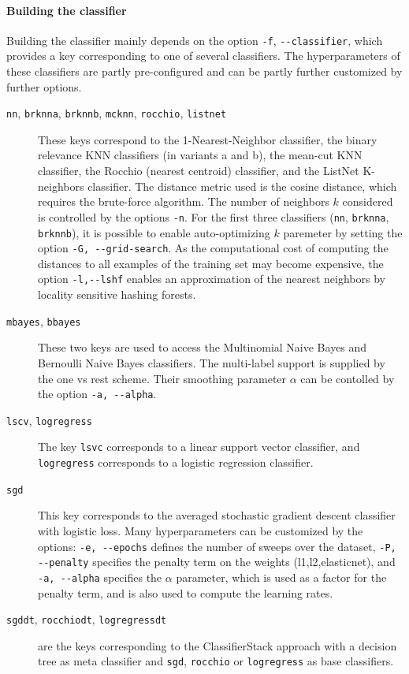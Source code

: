 \documentclass{article}
\begin{document}
\paragraph{Building the classifier}
Building the classifier mainly depends on the option \texttt{-f}, \texttt{{-}{-}classifier},
which provides a key corresponding to one of several classifiers.
The hyperparameters of these classifiers are partly pre-configured and can be partly further customized by further options.
\begin{description}
  \item[\texttt{nn}, \texttt{brknna}, \texttt{brknnb}, \texttt{mcknn}, \texttt{rocchio}, \texttt{listnet}]
    These keys correspond to the 1-Nearest-Neighbor classifier,
    the binary relevance KNN classifiers (in variants a and b),
    the mean-cut KNN classifier,
    the Rocchio (nearest centroid) classifier,
    and the ListNet K-neighbors classifier.
    The distance metric used is the cosine distance,
    which requires the brute-force algorithm.
    The number of neighbors $k$ considered is controlled by the options \texttt{-n}.
    For the first three classifiers (\texttt{nn}, \texttt{brknna}, \texttt{brknnb}),
    it is possible to enable auto-optimizing $k$ paremeter by setting the option \texttt{-G, {-}{-}grid-search}.
    As the computational cost of computing the distances to all examples of the training set may become expensive,
    the option \texttt{-l,{-}{-}lshf} enables an approximation
    of the nearest neighbors by locality sensitive hashing forests.
  \item[\texttt{mbayes}, \texttt{bbayes}]
    These two keys are used to access the Multinomial Naive Bayes and Bernoulli Naive Bayes classifiers.
    The multi-label support is supplied by the one vs rest scheme.
    Their smoothing parameter $\alpha$ can be contolled by the option \texttt{-a, {-}{-}alpha}.
  \item[\texttt{lscv}, \texttt{logregress}]
    The key \texttt{lsvc} corresponds to a linear support vector classifier,
    and \texttt{logregress} corresponds to a logistic regression classifier.
  \item[\texttt{sgd}]
    This key corresponds to the averaged stochastic gradient descent classifier with logistic loss.
    Many hyperparameters can be customized by the options:
    \texttt{-e, {-}{-}epochs} defines the number of sweeps over the dataset,
    \texttt{-P, {-}{-}penalty} specifies the penalty term on the weights (l1,l2,elasticnet), and
    \texttt{-a, {-}{-}alpha} specifies the $\alpha$ parameter, which is used as a factor for the penalty term,
    and is also used to compute the learning rates.
  \item[\texttt{sgddt}, \texttt{rocchiodt}, \texttt{logregressdt}]
    are the keys corresponding to the ClassifierStack approach with a decision tree as meta classifier
    and \texttt{sgd}, \texttt{rocchio} or \texttt{logregress} as base classifiers.
\end{description}
\end{document}
